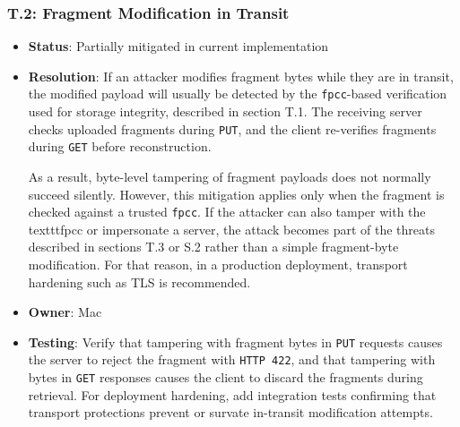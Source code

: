\documentclass[../veristore_security_model.tex]{subfiles}
\begin{document}
\subsubsection{T.2: Fragment Modification in Transit}
\begin{itemize}
    \item \textbf{Status}: Partially mitigated in current implementation
    \item \textbf{Resolution}: If an attacker modifies fragment bytes while they are in transit, the modified payload will usually be detected by the \texttt{fpcc}-based verification used for storage integrity, described in section T.1. The receiving server checks uploaded fragments during \texttt{PUT}, and the client re-verifies fragments during \texttt{GET} before reconstruction.
    
    As a result, byte-level tampering of fragment payloads does not normally succeed silently. However, this mitigation applies only when the fragment is checked against a trusted \texttt{fpcc}. If the attacker can also tamper with the texttt{fpcc} or impersonate a server, the attack becomes part of the threats described in sections T.3 or S.2 rather than a simple fragment-byte modification. For that reason, in a production deployment, transport hardening such as TLS is recommended.
    \item \textbf{Owner}: Mac
    \item \textbf{Testing}: Verify that tampering with fragment bytes in \texttt{PUT} requests causes the server to reject the fragment with \texttt{HTTP 422}, and that tampering with bytes in \texttt{GET} responses causes the client to discard the fragments during retrieval. For deployment hardening, add integration tests confirming that transport protections prevent or survate in-transit modification attempts.
\end{itemize}
\end{document}
